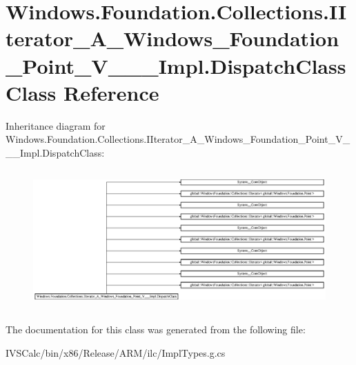 \hypertarget{class_windows_1_1_foundation_1_1_collections_1_1_i_iterator___a___windows___foundation___point__b3af97d706cc9d4a56489c90edc287b9}{}\section{Windows.\+Foundation.\+Collections.\+I\+Iterator\+\_\+\+A\+\_\+\+Windows\+\_\+\+Foundation\+\_\+\+Point\+\_\+\+V\+\_\+\+\_\+\+\_\+\+Impl.\+Dispatch\+Class Class Reference}
\label{class_windows_1_1_foundation_1_1_collections_1_1_i_iterator___a___windows___foundation___point__b3af97d706cc9d4a56489c90edc287b9}
Inheritance diagram for Windows.\+Foundation.\+Collections.\+I\+Iterator\+\_\+\+A\+\_\+\+Windows\+\_\+\+Foundation\+\_\+\+Point\+\_\+\+V\+\_\+\+\_\+\+\_\+\+Impl.\+Dispatch\+Class\+:\begin{figure}[H]
\begin{center}
\leavevmode
\includegraphics[height=5.394046cm]{class_windows_1_1_foundation_1_1_collections_1_1_i_iterator___a___windows___foundation___point__b3af97d706cc9d4a56489c90edc287b9}
\end{center}
\end{figure}


The documentation for this class was generated from the following file\+:\begin{DoxyCompactItemize}
\item 
I\+V\+S\+Calc/bin/x86/\+Release/\+A\+R\+M/ilc/Impl\+Types.\+g.\+cs\end{DoxyCompactItemize}
